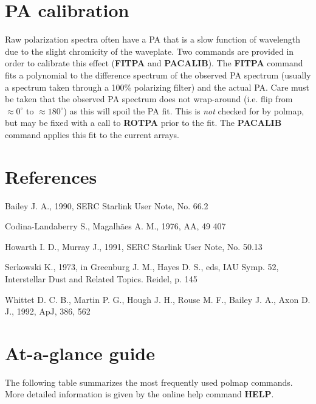 \section{PA calibration}

Raw polarization spectra often have a PA that is a slow function of
wavelength due to the slight chromicity of the waveplate. Two commands
are provided in order to calibrate this effect ({\bf FITPA} and {\bf
PACALIB}). The {\bf FITPA} command fits a polynomial to the difference
spectrum of the observed PA spectrum (usually a spectrum taken through
a 100\% polarizing filter) and the actual PA.  Care must be taken
that the observed PA spectrum does not wrap-around (i.e. flip from
$\approx0^\circ$ to $\approx180^\circ$) as this will spoil the PA
fit. This is {\em not} checked for by {\sc polmap}, but may be fixed with a
call to {\bf ROTPA} prior to the fit. The {\bf PACALIB}
command applies this fit to the current arrays.

\section{References}

Bailey J. A., 1990, SERC Starlink User Note, No. 66.2

Codina-Landaberry S., Magalh\~{a}es A. M., 1976, AA, 49 407

Howarth I. D., Murray J., 1991, SERC Starlink User Note, No. 50.13

Serkowski K., 1973, in Greenburg J. M., Hayes D. S., eds, IAU Symp. 52,
Interstellar Dust and Related Topics. Reidel, p. 145

Whittet D. C. B., Martin P. G., Hough J. H., Rouse M. F., Bailey J. A.,
Axon D. J., 1992, ApJ, 386, 562

\appendix
\newpage
\section{At-a-glance guide}

The following table summarizes the most frequently used {\sc polmap}
commands. More detailed information is given by the online help
command {\bf HELP}.

